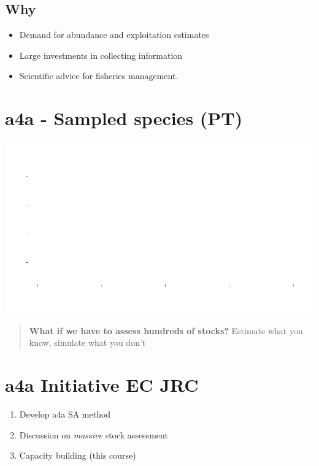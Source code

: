 \documentclass[]{article}
\providecommand{\tightlist}{%
  \setlength{\itemsep}{0pt}\setlength{\parskip}{0pt}}
\begin{document}
\subsection{Why}\label{why}

\begin{itemize}
\tightlist
\item
  Demand for abundance and exploitation estimates
\item
  Large investments in collecting information
\item
  Scientific advice for fisheries management.
\end{itemize}

\section{a4a - Sampled species (PT)}\label{a4a---sampled-species-pt}

\centering
\includegraphics[keepaspectratio, height=0.6\textheight]{graphics/pt.png}

\begin{quote}
\textbf{What if we have to assess hundreds of stocks?} Estimate what you
know, simulate what you don't
\end{quote}

\section{a4a Initiative EC JRC}\label{a4a-initiative-ec-jrc}

\begin{enumerate}
\def\labelenumi{\arabic{enumi}.}
\tightlist
\item
  Develop a4a SA method
\item
  Discussion on \emph{massive} stock assessment
\item
  Capacity building (this course)
\end{enumerate}
\end{document}
